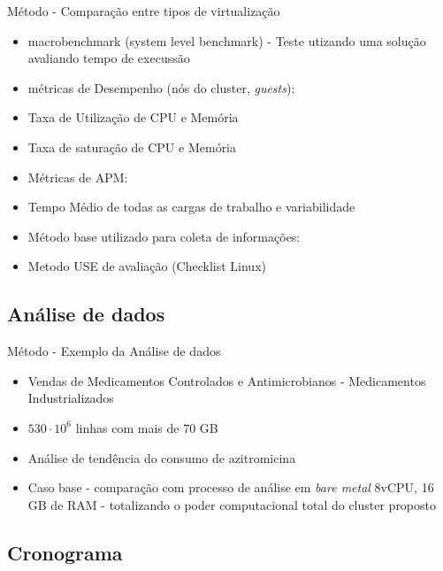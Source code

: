 \documentclass[10pt,brazil]{beamer}
\theoremstyle{definition}
\begin{document}
\begin{frame}{Método - Comparação entre tipos de virtualização}
\begin{itemize}
  \item macrobenchmark (system level benchmark) - Teste utizando uma solução avaliando tempo de execussão
  \item[] métricas de Desempenho (nós do cluster, \emph{guests}):
  \item Taxa de Utilização de CPU e Memória 
  \item Taxa de saturação de CPU e Memória
  \item[] Métricas de APM:
  \item Tempo Médio de todas as cargas de trabalho e variabilidade
  \item[] Método base utilizado para coleta de informações:
  \item Metodo USE de avaliação (Checklist Linux)
  \end{itemize}
  
\end{frame}


\subsection{Análise de dados}

\begin{frame}{Método - Exemplo da Análise de dados}
  \begin{itemize}
    \item Vendas de Medicamentos Controlados e Antimicrobianos - Medicamentos Industrializados
    \item $530 \cdot 10^{6}$ linhas com mais de 70 GB
    \item Análise de tendência do consumo de azitromicina
    \item Caso base - comparação com processo de análise em \emph{bare metal} 8vCPU, 16 GB de RAM - totalizando o poder computacional total do cluster proposto
  \end{itemize}
\end{frame}

\subsection{Cronograma}
\end{document}
